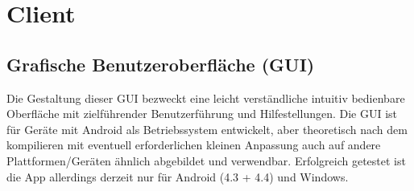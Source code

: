 \chapter{Client}
\thispagestyle{fancy}
\label{client}



\section{Grafische Benutzeroberfläche (GUI)}

Die Gestaltung dieser GUI bezweckt eine leicht verständliche intuitiv bedienbare Oberfläche mit zielführender Benutzerführung und Hilfestellungen.
Die GUI ist für Geräte mit Android als Betriebssystem entwickelt, aber theoretisch nach dem kompilieren mit eventuell erforderlichen kleinen Anpassung auch auf andere Plattformen/Geräten ähnlich abgebildet und verwendbar. Erfolgreich getestet ist die App allerdings derzeit nur für Android (4.3 + 4.4) und Windows.

